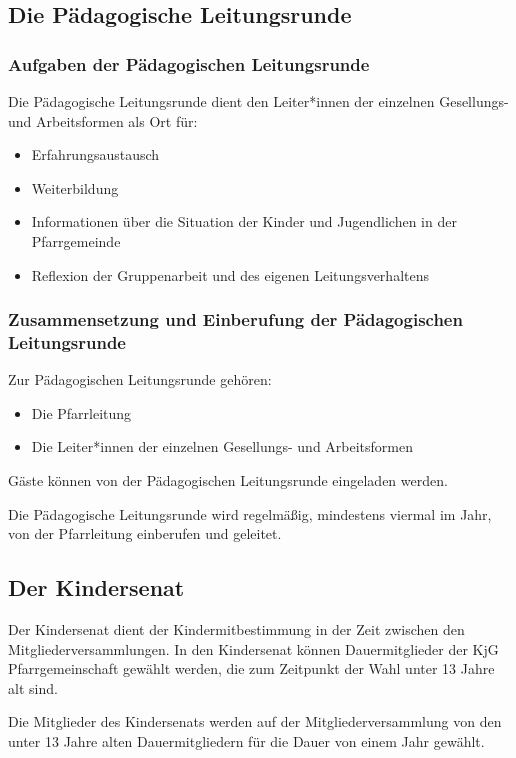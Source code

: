 \documentclass[12pt]{report}
\begin{document}
\begin{justify}
\subsection{Die Pädagogische Leitungsrunde}

\subsubsection{Aufgaben der Pädagogischen Leitungsrunde}
Die Pädagogische Leitungsrunde dient den Leiter*innen der einzelnen Gesellungs- und Arbeitsformen als Ort für:
\begin{itemize}
  \item Erfahrungsaustausch
  \item Weiterbildung
  \item Informationen über die Situation der Kinder und Jugendlichen in der Pfarrgemeinde
  \item Reflexion der Gruppenarbeit und des eigenen Leitungsverhaltens
\end{itemize}

\subsubsection{Zusammensetzung und Einberufung der Pädagogischen Leitungsrunde}
Zur Pädagogischen Leitungsrunde gehören:
\begin{itemize}
  \item Die Pfarrleitung
  \item Die Leiter*innen der einzelnen Gesellungs- und Arbeitsformen
\end{itemize}

Gäste können von der Pädagogischen Leitungsrunde eingeladen werden.

Die Pädagogische Leitungsrunde wird regelmäßig, mindestens viermal im Jahr,
von der Pfarrleitung einberufen und geleitet.

\subsection{Der Kindersenat}
Der Kindersenat dient der Kindermitbestimmung in der Zeit zwischen den Mitgliederversammlungen.
In den Kindersenat können Dauermitglieder der KjG Pfarrgemeinschaft gewählt werden,
die zum Zeitpunkt der Wahl unter 13 Jahre alt sind.

Die Mitglieder des Kindersenats werden auf der Mitgliederversammlung von den unter 13 Jahre alten
Dauermitgliedern für die Dauer von einem Jahr gewählt.


\end{justify}
\end{document}
